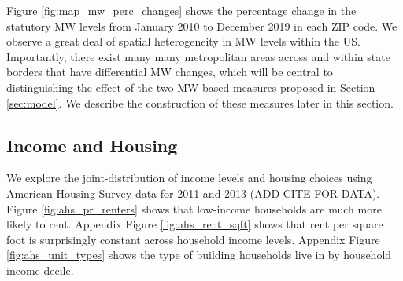 Figure \ref{fig:map_mw_perc_changes} shows the percentage change 
in the statutory MW levels from January 2010 to December 2019 in each ZIP code.
We observe a great deal of spatial heterogeneity in MW levels within the US.
Importantly, there exist many many metropolitan areas across and within state 
borders that have differential MW changes, which will be central to 
distinguishing the effect of the two MW-based measures proposed in 
Section \ref{sec:model}.
We describe the construction of these measures later in this section.

\subsection{Income and Housing}
\label{sec:data_income_housing}

We explore the joint-distribution of income levels and housing choices using 
American Housing Survey data for 2011 and 2013 (ADD CITE FOR DATA).
Figure \ref{fig:ahs_pr_renters} shows that low-income households are much
more likely to rent.
Appendix Figure \ref{fig:ahs_rent_sqft} shows that rent per square foot is 
surprisingly constant across household income levels.
Appendix Figure \ref{fig:ahs_unit_types} shows the type of building households
live in by household income decile.

